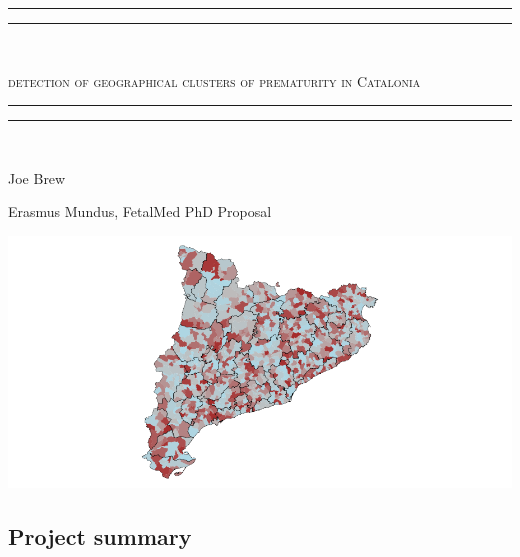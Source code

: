 \documentclass{article}
\begin{document}





\begin{center}

\rule{\textwidth}{1.6pt}\vspace*{-\baselineskip}\vspace*{2pt} %
\rule{\textwidth}{0.4pt}\\[\baselineskip] %


\begin{LARGE}
\scshape{detection of geographical clusters of prematurity in Catalonia}
\end{LARGE}

\rule{\textwidth}{0.4pt}\vspace*{-\baselineskip}\vspace{3.2pt} %
\rule{\textwidth}{1.6pt}\\[\baselineskip] %

\vspace{10mm}

\begin{Large}
Joe Brew
\end{Large}
\vspace{3mm}

\begin{large}
Erasmus Mundus, FetalMed PhD Proposal 
\end{large}

\vspace{20mm}
\includegraphics{protocol-001}

\vspace{20mm}


\subsection*{Project summary}

\end{center}
\end{document}
